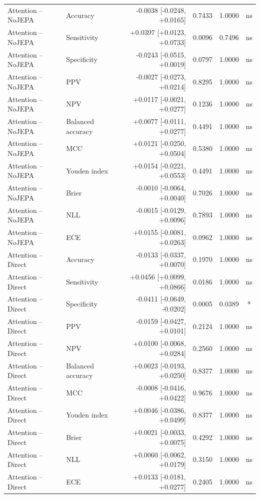 \begin{table}[t]
\begin{tabular}{llrrrc}
Attention -- NoJEPA & Accuracy & -0.0038 [-0.0248, +0.0165] & 0.7433 & 1.0000 & ns \\
Attention -- NoJEPA & Sensitivity & +0.0397 [+0.0123, +0.0733] & 0.0096 & 0.7496 & ns \\
Attention -- NoJEPA & Specificity & -0.0243 [-0.0515, +0.0019] & 0.0797 & 1.0000 & ns \\
Attention -- NoJEPA & PPV & -0.0027 [-0.0273, +0.0214] & 0.8295 & 1.0000 & ns \\
Attention -- NoJEPA & NPV & +0.0117 [-0.0021, +0.0277] & 0.1236 & 1.0000 & ns \\
Attention -- NoJEPA & Balanced accuracy & +0.0077 [-0.0111, +0.0277] & 0.4491 & 1.0000 & ns \\
Attention -- NoJEPA & MCC & +0.0121 [-0.0250, +0.0504] & 0.5380 & 1.0000 & ns \\
Attention -- NoJEPA & Youden index & +0.0154 [-0.0221, +0.0553] & 0.4491 & 1.0000 & ns \\
Attention -- NoJEPA & Brier & -0.0010 [-0.0064, +0.0040] & 0.7026 & 1.0000 & ns \\
Attention -- NoJEPA & NLL & -0.0015 [-0.0129, +0.0096] & 0.7893 & 1.0000 & ns \\
Attention -- NoJEPA & ECE & +0.0155 [-0.0081, +0.0263] & 0.0962 & 1.0000 & ns \\
Attention -- Direct & Accuracy & -0.0133 [-0.0337, +0.0070] & 0.1970 & 1.0000 & ns \\
Attention -- Direct & Sensitivity & +0.0456 [+0.0099, +0.0866] & 0.0186 & 1.0000 & ns \\
Attention -- Direct & Specificity & -0.0411 [-0.0649, -0.0202] & 0.0005 & 0.0389 & * \\
Attention -- Direct & PPV & -0.0159 [-0.0427, +0.0101] & 0.2124 & 1.0000 & ns \\
Attention -- Direct & NPV & +0.0100 [-0.0068, +0.0284] & 0.2560 & 1.0000 & ns \\
Attention -- Direct & Balanced accuracy & +0.0023 [-0.0193, +0.0250] & 0.8377 & 1.0000 & ns \\
Attention -- Direct & MCC & -0.0008 [-0.0416, +0.0422] & 0.9676 & 1.0000 & ns \\
Attention -- Direct & Youden index & +0.0046 [-0.0386, +0.0499] & 0.8377 & 1.0000 & ns \\
Attention -- Direct & Brier & +0.0021 [-0.0033, +0.0075] & 0.4292 & 1.0000 & ns \\
Attention -- Direct & NLL & +0.0060 [-0.0062, +0.0179] & 0.3150 & 1.0000 & ns \\
Attention -- Direct & ECE & +0.0133 [-0.0181, +0.0277] & 0.2405 & 1.0000 & ns \\
\bottomrule
\end{tabular}
\end{table}
